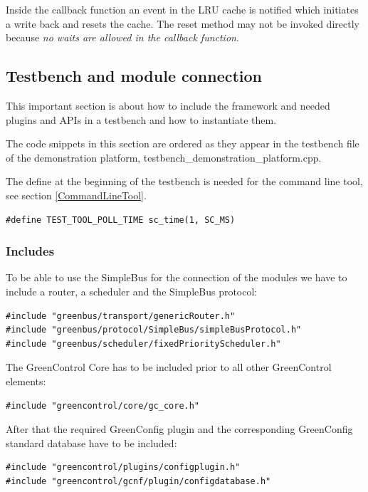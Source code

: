 Inside the callback function an event in the LRU cache is notified which initiates a write back and resets the cache. The reset method may not be invoked directly because \emph{no waits are allowed in the callback function}.


\subsection{Testbench and module connection}

This important section is about how to include the framework and needed plugins and APIs in a testbench and how to instantiate them.

The code snippets in this section are ordered as they appear in the testbench file of the demonstration platform, testbench\_demonstration\_platform.cpp.

The define at the beginning of the testbench is needed for the command line tool, see section \ref{CommandLineTool}.
\begin{lstlisting}
#define TEST_TOOL_POLL_TIME sc_time(1, SC_MS)
\end{lstlisting}

\subsubsection{Includes}

To be able to use the SimpleBus for the connection of the modules we have to include a router, a scheduler and the SimpleBus protocol:
\begin{lstlisting}
#include "greenbus/transport/genericRouter.h"
#include "greenbus/protocol/SimpleBus/simpleBusProtocol.h"
#include "greenbus/scheduler/fixedPriorityScheduler.h"
\end{lstlisting}

The GreenControl Core has to be included prior to all other GreenControl elements:
\begin{lstlisting}
#include "greencontrol/core/gc_core.h"
\end{lstlisting}

After that the required GreenConfig  plugin and the corresponding GreenConfig standard database have to be included:
\begin{lstlisting}
#include "greencontrol/plugins/configplugin.h"
#include "greencontrol/gcnf/plugin/configdatabase.h"
\end{lstlisting}

